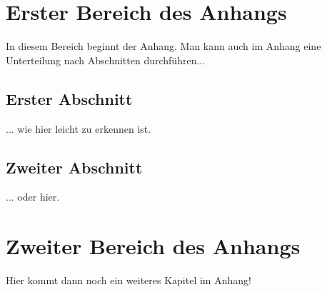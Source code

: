 \begin{appendix}
\chapter{Erster Bereich des Anhangs}
In diesem Bereich beginnt der Anhang. Man kann auch im Anhang eine Unterteilung nach Abschnitten durchführen...
\section{Erster Abschnitt}
\label{app:c1:s1}
... wie hier leicht zu erkennen ist.
\section{Zweiter Abschnitt}
... oder hier.

\chapter{Zweiter Bereich des Anhangs}
Hier kommt dann noch ein weiteres Kapitel im Anhang!

\end{appendix}

